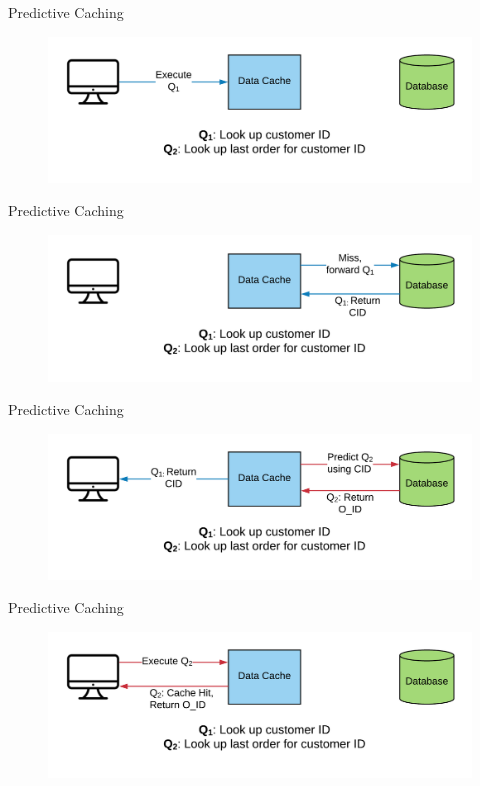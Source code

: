 \documentclass[12pt]{beamer}
\begin{document}
\begin{frame}{Predictive Caching}
    \begin{figure}
        \center
        \includegraphics[scale=0.17]{apollo_predictive_execution}
    \end{figure}
\end{frame}

\begin{frame}{Predictive Caching}
    \begin{figure}
        \center
        \includegraphics[scale=0.17]{apollo_predictive_execution_2}
    \end{figure}
\end{frame}

\begin{frame}{Predictive Caching}
    \begin{figure}
        \center
        \includegraphics[scale=0.17]{apollo_predictive_execution_4}
    \end{figure}
\end{frame}

\begin{frame}{Predictive Caching}
    \begin{figure}
        \center
        \includegraphics[scale=0.17]{apollo_predictive_execution_5}
    \end{figure}
\end{frame}
\end{document}
